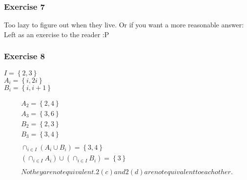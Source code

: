 \subsubsection{Exercise 7}
Too lazy to figure out when they live.
Or if you want a more reasonable answer: Left as an exercise to the reader :P
\subsubsection{Exercise 8}
\begin{center}
  $I = \left\{2,3\right\}$ \\
  $A_i = \left\{ i,2i \right\}$ \\
  $B_i = \left\{ i, i + 1 \right\}$ \\
\end{center}
\begin{align*}
  A_2 = \left\{ 2, 4 \right\} \\
  A_3 = \left\{ 3, 6 \right\} \\
  B_2 = \left\{ 2, 3 \right\} \\
  B_3 = \left\{ 3, 4 \right\} \\ \\
  \cap_{i \in I}(A_i \cup B_i) = \left\{3,4 \right\} \\
  (\cap_{i \in I}A_i) \cup (\cap_{i \in I}B_i) = \left\{ 3\right\} \\ \\
  No they are not equivalent. 2(c) and 2(d) are not equivalent to each other.
\end{align*}

